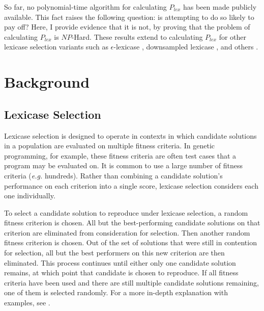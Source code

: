 \documentclass[sigconf]{acmart}
\begin{document}
So far, no polynomial-time algorithm for calculating $P_{lex}$ has been made publicly available. This fact raises the following question: is attempting to do so likely to pay off? Here, I provide evidence that it is not, by proving that the problem of calculating $P_{lex}$ is $NP$-Hard. %
These results extend to calculating $P_{lex}$ for other lexicase selection variants such as $\epsilon$-lexicase \citep{la_cava_epsilon-lexicase_2016}, downsampled lexicase \citep{hernandez_random_2019,ferguson_characterizing_2020}, and others \citep{spector_relaxations_2018}.

\section{Background}

\subsection{Lexicase Selection}

Lexicase selection is designed to operate in contexts in which candidate solutions in a population are evaluated on multiple fitness criteria. In genetic programming, for example, these fitness criteria are often test cases that a program may be evaluated on. It is common to use a large number of fitness criteria (\textit{e.g.} hundreds). Rather than combining a candidate solution's performance on each criterion into a single score, lexicase selection considers each one individually. 

To select a candidate solution to reproduce under lexicase selection, a random fitness criterion is chosen. All but the best-performing candidate solutions on that criterion are eliminated from consideration for selection. Then another random fitness criterion is chosen. Out of the set of solutions that were still in contention for selection, all but the best performers on this new criterion are then eliminated. This process continues until either only one candidate solution remains, at which point that candidate is chosen to reproduce. If all fitness criteria have been used and there are still multiple candidate solutions remaining, one of them is selected randomly. For a more in-depth explanation with examples, see \citep{spector_assessment_2012, la_cava_probabilistic_2018}.
\end{document}
